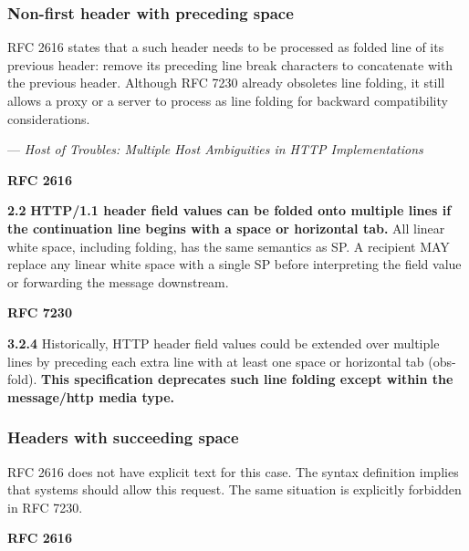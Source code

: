 \subsubsection{Non-first header with preceding space}
RFC 2616 states that a such header needs to be processed as folded line of its previous header: remove its preceding line break characters to concatenate with the
previous header. Although RFC 7230 already obsoletes line folding, it still allows a proxy or a server to process as line folding for backward compatibility considerations.

\hspace{1 cm}--- \textit{Host of Troubles: Multiple Host Ambiguities in HTTP Implementations}

\textbf{RFC 2616}
\columnseprule=1pt    %
\begin{multicols}{2}
	\begin{spacing}{0.8}
		\textbf{2.2} 
		{\footnotesize  \textbf{HTTP/1.1 header field values can be folded onto multiple lines if the continuation line begins with a space or horizontal tab.} All linear white space, including folding, has the same semantics as SP. A recipient MAY replace any linear white space with a single SP before interpreting the field value or forwarding the message downstream. }
	\end{spacing}
\end{multicols}

\textbf{RFC 7230}
\columnseprule=1pt    %
\begin{multicols}{2}
	\begin{spacing}{0.8}
		\textbf{3.2.4} 
		{\footnotesize Historically, HTTP header field values could be extended over
		multiple lines by preceding each extra line with at least one space or horizontal tab (obs-fold).\textbf{ This specification deprecates such line folding except within the message/http media type.}}
	\end{spacing}
\end{multicols}

\subsubsection{Headers with succeeding space}
RFC 2616 does not have explicit text for this case. The syntax definition implies that systems should allow this request. The same situation is explicitly forbidden in RFC 7230.

\textbf{RFC 2616}
\columnseprule=1pt    %
\begin{multicols}{2}
	\begin{spacing}{0.8}
		\textbf{} 
		{\footnotesize  }
	\end{spacing}
\end{multicols}

